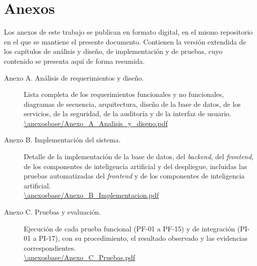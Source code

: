 \documentclass[spanish, 12pt, oneside]{Thesis}
\newif\ifrevision
\newenvironment{nuevotexto}{\ifrevision\color{blue}\fi}{}
\begin{document}
\chapter*{Anexos}
\label{chap:anexos}

\begin{nuevotexto}
Los anexos de este trabajo se publican en formato digital, en el mismo repositorio en el que se mantiene el presente documento.
Contienen la versión extendida de los capítulos de análisis y diseño, de implementación y de pruebas, cuyo contenido se presenta aquí de forma resumida.

\begin{description}
    \item[Anexo A. Análisis de requerimientos y diseño.] Lista completa de los requerimientos funcionales y no funcionales, diagramas de secuencia, arquitectura, diseño de la base de datos, de los servicios, de la seguridad, de la auditoría y de la interfaz de usuario. \\
    \url{\anexosbase/Anexo_A_Analisis_y_diseno.pdf}
    \item[Anexo B. Implementación del sistema.] Detalle de la implementación de la base de datos, del \textit{backend}, del \textit{frontend}, de los componentes de inteligencia artificial y del despliegue, incluidas las pruebas automatizadas del \textit{frontend} y de los componentes de inteligencia artificial. \\
    \url{\anexosbase/Anexo_B_Implementacion.pdf}
    \item[Anexo C. Pruebas y evaluación.] Ejecución de cada prueba funcional (PF-01 a PF-15) y de integración (PI-01 a PI-17), con su procedimiento, el resultado observado y las evidencias correspondientes. \\
    \url{\anexosbase/Anexo_C_Pruebas.pdf}
\end{description}
\end{nuevotexto}
\end{document}
